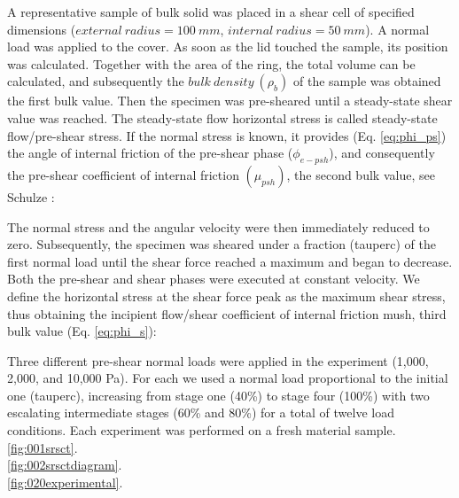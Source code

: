 A representative sample of bulk solid was placed in a shear cell of specified
dimensions ($external ~ radius = 100 ~ mm$, $internal ~ radius = 50 ~ mm$).
A normal load was applied to the cover. As soon as the lid touched the sample,
its position was calculated.
Together with the area of the ring, the total volume can be calculated, and subsequently the $bulk ~ density ~ (\rho_b)$ 
of the sample was obtained the first bulk value.
Then the specimen was pre-sheared until a steady-state shear value was reached.
The steady-state flow horizontal stress
is called steady-state flow/pre-shear stress.
If the normal stress is known, it provides (Eq. \ref{eq:phi_ps}) the angle of
internal friction of the pre-shear phase ($\phi_{e-psh}$), and consequently the
pre-shear coefficient of internal friction $ (\mu_{psh})$, the second
bulk value, see Schulze \cite{RefWorks:118}:

The normal stress and the angular velocity were then immediately reduced to zero. 
Subsequently, the specimen was sheared under a fraction (\acs{tauperc}) of the
first normal load until the shear force reached a maximum and began to decrease. 
Both the pre-shear and shear phases were executed at constant velocity. 
We define the horizontal stress at the shear force peak as the maximum shear
stress, thus obtaining the incipient flow/shear coefficient of internal friction
\acs{mush}, third bulk value (Eq. \ref{eq:phi_s})\cite{RefWorks:118}:

Three different pre-shear normal loads were applied in the experiment
(1,000, 2,000, and 10,000 Pa).
For each we used a normal load proportional to the initial one
(\acs{tauperc}), increasing from stage one (40\%) to stage four (100\%)
with two escalating intermediate stages (60\% and 80\%) for a total of twelve load conditions.
Each experiment was performed on a fresh material sample. \\

\ref{fig:001srsct}.\\


\ref{fig:002srsctdiagram}.\\


\ref{fig:020experimental}.\\


